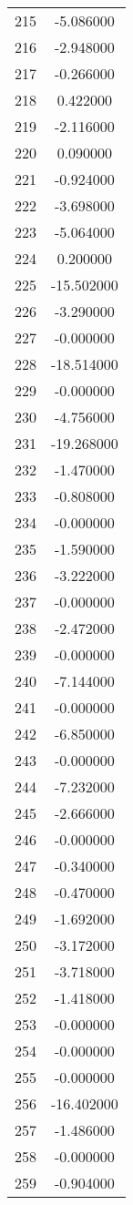 \documentclass[12pt]{article}
\begin{document}
\begin{longtable}{@{}cc@{}}
215 & -5.086000 \\
216 & -2.948000 \\
217 & -0.266000 \\
218 & 0.422000 \\
219 & -2.116000 \\
220 & 0.090000 \\
221 & -0.924000 \\
222 & -3.698000 \\
223 & -5.064000 \\
224 & 0.200000 \\
225 & -15.502000 \\
226 & -3.290000 \\
227 & -0.000000 \\
228 & -18.514000 \\
229 & -0.000000 \\
230 & -4.756000 \\
231 & -19.268000 \\
232 & -1.470000 \\
233 & -0.808000 \\
234 & -0.000000 \\
235 & -1.590000 \\
236 & -3.222000 \\
237 & -0.000000 \\
238 & -2.472000 \\
239 & -0.000000 \\
240 & -7.144000 \\
241 & -0.000000 \\
242 & -6.850000 \\
243 & -0.000000 \\
244 & -7.232000 \\
245 & -2.666000 \\
246 & -0.000000 \\
247 & -0.340000 \\
248 & -0.470000 \\
249 & -1.692000 \\
250 & -3.172000 \\
251 & -3.718000 \\
252 & -1.418000 \\
253 & -0.000000 \\
254 & -0.000000 \\
255 & -0.000000 \\
256 & -16.402000 \\
257 & -1.486000 \\
258 & -0.000000 \\
259 & -0.904000 \\

\end{longtable}
\end{document}
